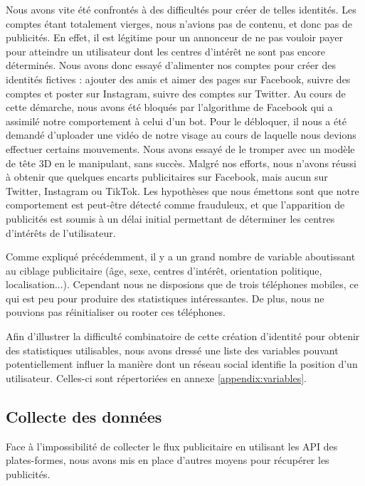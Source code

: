 \documentclass[runningheads]{llncs}
\begin{document}
Nous avons vite été confrontés à des difficultés pour créer de telles identités. Les comptes étant totalement vierges, nous n'avions pas de contenu, et donc pas de publicités. En effet, il est légitime pour un annonceur de ne pas vouloir payer pour atteindre un utilisateur dont les centres d'intérêt ne sont pas encore déterminés. Nous avons donc essayé d'alimenter nos comptes pour créer des identités fictives : ajouter des amis et aimer des pages sur Facebook, suivre des comptes et poster sur Instagram, suivre des comptes sur Twitter. Au cours de cette démarche, nous avons été bloqués par l'algorithme de Facebook qui a assimilé notre comportement à celui d'un bot. Pour le débloquer, il nous a été demandé d'uploader une vidéo de notre visage au cours de laquelle nous devions effectuer certains mouvements. Nous avons essayé de le tromper avec un modèle de tête 3D en le manipulant, sans succès. Malgré nos efforts, nous n'avons réussi à obtenir que quelques encarts publicitaires sur Facebook, mais aucun sur Twitter, Instagram ou TikTok. Les hypothèses que nous émettons sont que notre comportement est peut-être détecté comme frauduleux, et que l'apparition de publicités est soumis à un délai initial permettant de déterminer les centres d'intérêts de l'utilisateur.

Comme expliqué précédemment, il y a un grand nombre de variable aboutissant au ciblage publicitaire (âge, sexe, centres d'intérêt, orientation politique, localisation...). Cependant nous ne disposions que de trois téléphones mobiles, ce qui est peu pour produire des statistiques intéressantes. De plus, nous ne pouvions pas réinitialiser ou rooter ces téléphones. 

Afin d'illustrer la difficulté combinatoire de cette création d'identité pour obtenir des statistiques utilisables, nous avons dressé une liste des variables pouvant potentiellement influer la manière dont un réseau social identifie la position d'un utilisateur. Celles-ci sont répertoriées en annexe \ref{appendix:variables}.

\subsection{Collecte des données}

Face à l'impossibilité de collecter le flux publicitaire en utilisant les API des plates-formes, nous avons mis en place d'autres moyens pour récupérer les publicités. 
\end{document}
